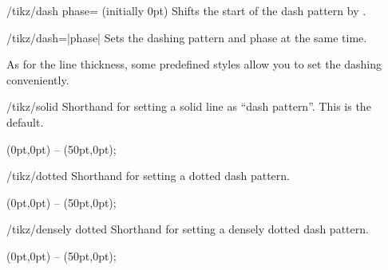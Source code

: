 \begin{key}{/tikz/dash phase= (initially 0pt)}
    Shifts the start of the dash pattern by .
\begin{codeexample}[]
\begin{tikzpicture}[dash pattern=on 20pt off 10pt]
  \draw[dash phase=0pt] (0pt,3pt) -- (3.5cm,3pt);
  \draw[dash phase=10pt] (0pt,0pt) -- (3.5cm,0pt);
\end{tikzpicture}
\end{codeexample}
\end{key}

\begin{key}{/tikz/dash=|phase|}
    Sets the dashing pattern and phase at the same time.
\begin{codeexample}[]
\begin{tikzpicture}
  \draw [dash=on 20pt off 10pt phase  0pt] (0pt,3pt) -- (3.5cm,3pt);
  \draw [dash=on 20pt off 10pt phase 10pt] (0pt,0pt) -- (3.5cm,0pt);
\end{tikzpicture}
\end{codeexample}
\end{key}

As for the line thickness, some predefined styles allow you to set the dashing
conveniently.

\begin{stylekey}{/tikz/solid}
    Shorthand for setting a solid line as ``dash pattern''. This is the default.
\begin{codeexample}[]
\tikz \draw[solid] (0pt,0pt) -- (50pt,0pt);
\end{codeexample}
\end{stylekey}

\begin{stylekey}{/tikz/dotted}
    Shorthand for setting a dotted dash pattern.
\begin{codeexample}[]
\tikz \draw[dotted] (0pt,0pt) -- (50pt,0pt);
\end{codeexample}
\end{stylekey}

\begin{stylekey}{/tikz/densely dotted}
    Shorthand for setting a densely dotted dash pattern.
\begin{codeexample}[]
\tikz {} (0pt,0pt) -- (50pt,0pt);
\end{codeexample}
\end{stylekey}

